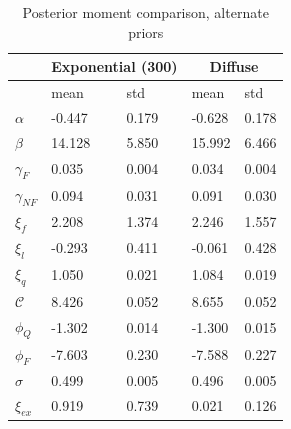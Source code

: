 \begin{table}[h!]
    \centering
    \begin{tabular}{lllll}
        \hline
         & \multicolumn{2}{|c|}{Exponential (300)}        & \multicolumn{2}{|c|}{Diffuse} \\ \hline\hline 
                            & mean    & std   & mean       & std    \\ \hline
         $\alpha$             & -0.447 & 0.179 & -0.628 & 0.178 \\ 
         $\beta$              & 14.128 & 5.850 & 15.992 & 6.466 \\ 
         $\gamma_{F}$         & 0.035  & 0.004 & 0.034  & 0.004 \\ 
         $\gamma_{NF}$        & 0.094  & 0.031 & 0.091  & 0.030 \\ 
         $\xi_f$              & 2.208  & 1.374 & 2.246  & 1.557 \\ 
         $\xi_l$              & -0.293 & 0.411 & -0.061 & 0.428 \\ 
         $\xi_q$              & 1.050  & 0.021 & 1.084  & 0.019 \\ 
         $\mathcal{C}$        & 8.426  & 0.052 & 8.655  & 0.052 \\ 
         $\phi_Q$             & -1.302 & 0.014 & -1.300 & 0.015 \\ 
         $\phi_F$             & -7.603 & 0.230 & -7.588 & 0.227 \\ 
         $\sigma$             & 0.499  & 0.005 & 0.496  & 0.005 \\ 
         $\xi_{ex}$           & 0.919  & 0.739 & 0.021  & 0.126 \\ \hline 
    \end{tabular}                              
    \caption{Posterior moment comparison, alternate priors}
    \label{tab:post_comp_priors}
\end{table}
